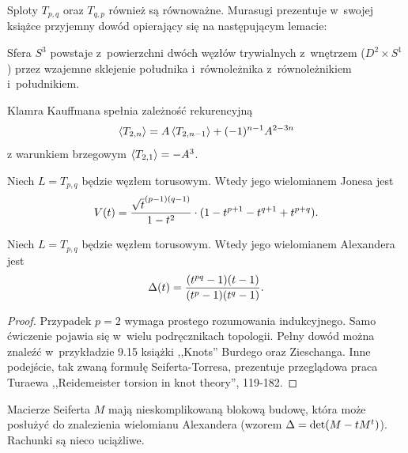 Sploty $T_{p, q}$ oraz $T_{q, p}$ również są równoważne.
Murasugi prezentuje w~swojej książce \cite{murasugi96} przyjemny dowód opierający się na następującym lemacie:

\begin{lemma}
    Sfera $S^3$ powstaje z~powierzchni dwóch węzłów trywialnych z~wnętrzem ($D^2 \times S^1$) przez wzajemne sklejenie południka i~równoleżnika z~równoleżnikiem i~południkiem.
\end{lemma}

\begin{proposition}
    Klamra Kauffmana spełnia zależność rekurencyjną
    \begin{equation}
        \left\langle{T_{2, n}}\right\rangle = A \left\langle{T_{2,n-1}}\right\rangle + (-1)^{n-1} A^{2-3n}
    \end{equation}
    z warunkiem brzegowym $\left\langle{T_{2,1}}\right\rangle = -A^3$.
\end{proposition}

\begin{proposition}
    Niech $L = T_{p, q}$ będzie węzłem torusowym.
    Wtedy jego wielomianem Jonesa jest
    \begin{equation}
        V(t) = \frac {{\sqrt t}^{(p-1)(q-1)}}{1-t^2} \cdot (1 - t^{p+1} - t^{q+1} + t^{p+q}).
    \end{equation}
\end{proposition}

\begin{proposition}
    Niech $L = T_{p, q}$ będzie węzłem torusowym.
    Wtedy jego wielomianem Alexandera jest
    \begin{equation}
         \Delta(t) = \frac{(t^{pq}-1)(t-1)}{(t^p-1)(t^q-1)}.
    \end{equation}
\end{proposition}

\begin{proof}
    Przypadek $p = 2$ wymaga prostego rozumowania indukcyjnego.
    Samo ćwiczenie pojawia się w~wielu podręcznikach topologii.
    Pełny dowód można znaleźć w~przykładzie 9.15 książki ,,Knots'' Burdego oraz Zieschanga.
    Inne podejście, tak zwaną formułę Seiferta-Torresa, prezentuje przeglądowa praca Turaewa ,,Reidemeister torsion in knot theory'', 119-182.
\end{proof}

Macierze Seiferta $M$ mają nieskomplikowaną blokową budowę, która może posłużyć do znalezienia wielomianu Alexandera (wzorem $\Delta = \det (M - tM^t)$).
Rachunki są nieco uciążliwe.

